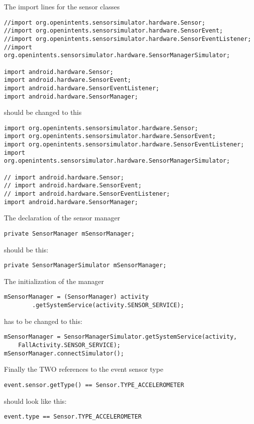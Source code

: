 \documentclass[a4paper, 10pt]{article}
\begin{document}
The import lines for the sensor classes
\begin{lstlisting}
//import org.openintents.sensorsimulator.hardware.Sensor;
//import org.openintents.sensorsimulator.hardware.SensorEvent;
//import org.openintents.sensorsimulator.hardware.SensorEventListener;
//import org.openintents.sensorsimulator.hardware.SensorManagerSimulator;

import android.hardware.Sensor;
import android.hardware.SensorEvent;
import android.hardware.SensorEventListener;
import android.hardware.SensorManager;
\end{lstlisting}
should be changed to this
\begin{lstlisting}
import org.openintents.sensorsimulator.hardware.Sensor;
import org.openintents.sensorsimulator.hardware.SensorEvent;
import org.openintents.sensorsimulator.hardware.SensorEventListener;
import org.openintents.sensorsimulator.hardware.SensorManagerSimulator;

// import android.hardware.Sensor;
// import android.hardware.SensorEvent;
// import android.hardware.SensorEventListener;
import android.hardware.SensorManager;
\end{lstlisting}
The declaration of the sensor manager
\begin{lstlisting}
private SensorManager mSensorManager;
\end{lstlisting}
should be this:
\begin{lstlisting}
private SensorManagerSimulator mSensorManager;
\end{lstlisting}
The initialization of the manager
\begin{lstlisting}
mSensorManager = (SensorManager) activity
		.getSystemService(activity.SENSOR_SERVICE);
\end{lstlisting}
has to be changed to this:
\begin{lstlisting}
mSensorManager = SensorManagerSimulator.getSystemService(activity,
    FallActivity.SENSOR_SERVICE);
mSensorManager.connectSimulator();
\end{lstlisting}
Finally the TWO references to the event sensor type
\begin{lstlisting}
event.sensor.getType() == Sensor.TYPE_ACCELEROMETER
\end{lstlisting}
should look like this:
\begin{lstlisting}
event.type == Sensor.TYPE_ACCELEROMETER
\end{lstlisting}
\end{document}
